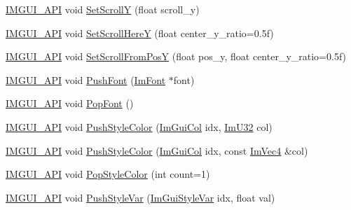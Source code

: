 \begin{DoxyCompactItemize}
\mbox{\hyperlink{imgui_8h_a43829975e84e45d1149597467a14bbf5}{I\+M\+G\+U\+I\+\_\+\+A\+PI}} void \mbox{\hyperlink{namespace_im_gui_a41833555962807384432e6fc94d46ec9}{Set\+ScrollY}} (float scroll\+\_\+y)
\item 
\mbox{\hyperlink{imgui_8h_a43829975e84e45d1149597467a14bbf5}{I\+M\+G\+U\+I\+\_\+\+A\+PI}} void \mbox{\hyperlink{namespace_im_gui_ac74487b4d75580ca637659103fef1368}{Set\+Scroll\+HereY}} (float center\+\_\+y\+\_\+ratio=0.\+5f)
\item 
\mbox{\hyperlink{imgui_8h_a43829975e84e45d1149597467a14bbf5}{I\+M\+G\+U\+I\+\_\+\+A\+PI}} void \mbox{\hyperlink{namespace_im_gui_a57d8e9497ad39584ba740cef70b78fb4}{Set\+Scroll\+From\+PosY}} (float pos\+\_\+y, float center\+\_\+y\+\_\+ratio=0.\+5f)
\item 
\mbox{\hyperlink{imgui_8h_a43829975e84e45d1149597467a14bbf5}{I\+M\+G\+U\+I\+\_\+\+A\+PI}} void \mbox{\hyperlink{namespace_im_gui_ac5a59f4f8226fd35786d8973c85b85a9}{Push\+Font}} (\mbox{\hyperlink{struct_im_font}{Im\+Font}} $\ast$font)
\item 
\mbox{\hyperlink{imgui_8h_a43829975e84e45d1149597467a14bbf5}{I\+M\+G\+U\+I\+\_\+\+A\+PI}} void \mbox{\hyperlink{namespace_im_gui_af66649bc37022bf3cf2496c73af9a499}{Pop\+Font}} ()
\item 
\mbox{\hyperlink{imgui_8h_a43829975e84e45d1149597467a14bbf5}{I\+M\+G\+U\+I\+\_\+\+A\+PI}} void \mbox{\hyperlink{namespace_im_gui_a77ee84afb636e05eb4b2d6eeddcc2aa8}{Push\+Style\+Color}} (\mbox{\hyperlink{imgui_8h_a1b0467ec582e731ae6292fef726fb5fe}{Im\+Gui\+Col}} idx, \mbox{\hyperlink{imgui_8h_a118cff4eeb8d00e7d07ce3d6460eed36}{Im\+U32}} col)
\item 
\mbox{\hyperlink{imgui_8h_a43829975e84e45d1149597467a14bbf5}{I\+M\+G\+U\+I\+\_\+\+A\+PI}} void \mbox{\hyperlink{namespace_im_gui_a5bd052ebf55015312a53739974950e7b}{Push\+Style\+Color}} (\mbox{\hyperlink{imgui_8h_a1b0467ec582e731ae6292fef726fb5fe}{Im\+Gui\+Col}} idx, const \mbox{\hyperlink{struct_im_vec4}{Im\+Vec4}} \&col)
\item 
\mbox{\hyperlink{imgui_8h_a43829975e84e45d1149597467a14bbf5}{I\+M\+G\+U\+I\+\_\+\+A\+PI}} void \mbox{\hyperlink{namespace_im_gui_a9795f730b4043a98b6254738d86efcdc}{Pop\+Style\+Color}} (int count=1)
\item 
\mbox{\hyperlink{imgui_8h_a43829975e84e45d1149597467a14bbf5}{I\+M\+G\+U\+I\+\_\+\+A\+PI}} void \mbox{\hyperlink{namespace_im_gui_aab3f43009094462cf2a5eb554785949b}{Push\+Style\+Var}} (\mbox{\hyperlink{imgui_8h_ac919acabce24faae590e295b424874ca}{Im\+Gui\+Style\+Var}} idx, float val)

\end{DoxyCompactItemize}
